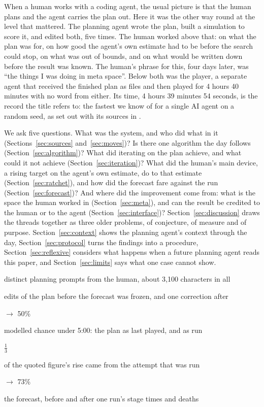 \documentclass[11pt,a4paper]{article}
\newcommand{\statcell}[2]{%
  \begin{minipage}[t]{0.177\textwidth}\raggedright
    {\sffamily\fontsize{17}{20}\selectfont #1\par}\vspace{3pt}
    {\sffamily\fontsize{7}{8.6}\selectfont\color{inkgrey}#2\par}
  \end{minipage}}
\newcommand{\statsep}{\hspace{0.5em}{\color{rulegrey}\vrule width 0.6pt}\hspace{0.6em}}
\begin{document}
When a human works with a coding agent, the usual picture is that the human plans and the agent carries the plan out. Here it was the other way round at the level that mattered. The planning agent wrote the plan, built a simulation to score it, and edited both, five times. The human worked above that: on what the plan was for, on how good the agent's own estimate had to be before the search could stop, on what was out of bounds, and on what would be written down before the result was known. The human's phrase for this, four days later, was ``the things I was doing in meta space''. Below both was the player, a separate agent that received the finished plan as files and then played for 4 hours 40 minutes with no word from either. Its time, 4 hours 39 minutes 54 seconds, is the record the title refers to: the fastest we know of for a single AI agent on a random seed, as set out with its sources in \citet{batsuk2026fifth}.

We ask five questions. What was the system, and who did what in it (Sections~\ref{sec:sources} and~\ref{sec:moves})? Is there one algorithm the day follows (Section~\ref{sec:algorithm})? What did iterating on the plan achieve, and what could it not achieve (Section~\ref{sec:iteration})? What did the human's main device, a rising target on the agent's own estimate, do to that estimate (Section~\ref{sec:ratchet}), and how did the forecast fare against the run (Section~\ref{sec:forecast})? And where did the improvement come from: what is the space the human worked in (Section~\ref{sec:meta}), and can the result be credited to the human or to the agent (Section~\ref{sec:interface})? Section~\ref{sec:discussion} draws the threads together as three older problems, of conjecture, of measure and of purpose. Section~\ref{sec:context} shows the planning agent's context through the day, Section~\ref{sec:protocol} turns the findings into a procedure, Section~\ref{sec:reflexive} considers what happens when a future planning agent reads this paper, and Section~\ref{sec:limits} says what one case cannot show.

\vspace{10pt}
\noindent
\statcell{21}{distinct planning prompts from the human, about 3,100 characters in all}\statsep
\statcell{5}{edits of the plan before the forecast was frozen, and one correction after}\statsep
\statcell{2 $\rightarrow$ 50\%}{modelled chance under 5:00: the plan as last played, and as run}\statsep
\statcell{$\frac{1}{3}$}{of the quoted figure's rise came from the attempt that was run}\statsep
\statcell{50 $\rightarrow$ 73\%}{the forecast, before and after one run's stage times and deaths}
\end{document}

